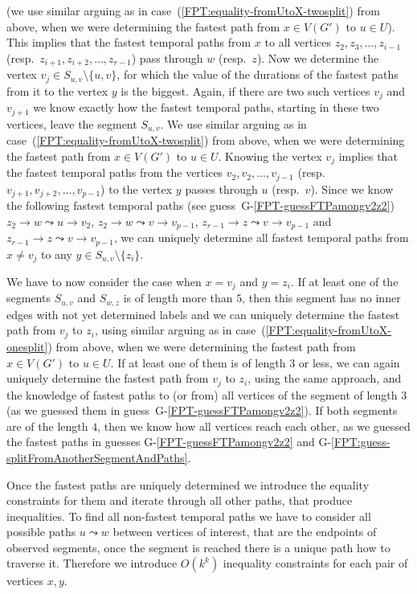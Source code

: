 \documentclass[a4paper,UKenglish,cleveref, autoref, thm-restate, anonymous]{lipics-v2021}
\begin{document}
\begin{enumerate}[(i)]
(we use similar arguing as in case~(\ref{FPT:equality-fromUtoX-twosplit}) from above, when we were determining the fastest path from $x \in V(G')$ to $u \in U$).
This implies that the fastest temporal paths from $x$ to all vertices $z_2, z_3, \dots, z_{i-1}$ (resp.~$z_{i+1}, z_{i+2}, \dots, z_{r-1}$)  pass through $w$ (resp.~$z$).
Now we determine the vertex $v_j \in S_{u,v} \setminus \{u,v\}$,
for which the value of the durations of the fastest paths from it to the vertex $y$ is the biggest.
Again, if there are two such vertices $v_{j}$ and $v_{j+1}$ we know exactly how the fastest temporal paths, starting in these two vertices,
leave the segment $S_{u,v}$. 
We use similar arguing as in case~(\ref{FPT:equality-fromUtoX-twosplit}) from above, when we were determining the fastest path from $x \in V(G')$ to $u \in U$.
Knowing the vertex $v_j$
implies that the fastest temporal paths from the vertices $v_2, v_2, \dots, v_{j-1}$ (resp.~$v_{j+1}, v_{j+2}, \dots, v_{p-1}$) to the vertex $y$ passes through $u$ (resp.~$v$).
Since we know the following fastest temporal paths (see guess~G-\ref{FPT-guessFTPamongv2z2}) 
$z_2 \rightarrow w \leadsto u \rightarrow v_2$,
$z_2 \rightarrow w \leadsto v \rightarrow v_{p-1}$,
$z_{r-1} \rightarrow z \leadsto v \rightarrow v_{p-1}$ and
$z_{r-1} \rightarrow z \leadsto v \rightarrow v_{p-1}$,
we can uniquely determine all fastest temporal paths from $x \neq v_j$ to any $y \in S_{u,v} \setminus \{z_i\}$.

We have to now consider the case when 
$x = v_j$ and $y = z_i$.
If at least one of the segments $S_{u,v}$ and $S_{w,z}$ is of length more than $5$,
then this segment has no inner edges with not yet determined labels
and
we can uniquely determine the fastest path from $v_j$ to $z_i$,
using 
similar arguing as in case~(\ref{FPT:equality-fromUtoX-onesplit}) from above, when we were determining the fastest path from $x \in V(G')$ to $u \in U$.
If at least one of them is of length $3$ or less,
we can again uniquely determine the fastest path from $v_j$ to $z_i$, using the same approach, 
and the knowledge of fastest paths to (or from) all vertices of the segment of length $3$
(as we guessed them in guess~G-\ref{FPT-guessFTPamongv2z2}).
If both segments are of the length $4$, then we know how all vertices reach each other,
as we guessed the fastest paths in guesses G-\ref{FPT-guessFTPamongv2z2} and G-\ref{FPT:guess-splitFromAnotherSegmentAndPaths}.
\end{enumerate}
Once the fastest paths are uniquely determined we introduce the equality constraints for them
and iterate through all other paths, that produce inequalities.
To find all non-fastest temporal paths we have to consider all possible paths $u \leadsto w$ between vertices of interest, that are the endpoints of observed segments,
once the segment is reached there is a unique path how to traverse it.
Therefore we introduce $O(k^k)$ inequality constraints for each pair of vertices $x,y$.
\end{document}
